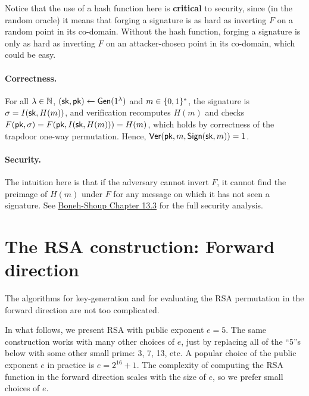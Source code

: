 Notice that the use of a hash function here is \textbf{critical} to
security, since (in the random oracle) it means that forging a signature
is as hard as inverting $F$ on a random point in its co-domain.
Without the hash function, forging a signature is only as hard as 
inverting $F$ on an attacker-chosen point in its co-domain, which 
could be easy.

\paragraph{Correctness.}
For all $\lambda \in \mathbb{N}$, $({\mathsf{sk}}, \mathsf{pk}) \gets \mathsf{Gen}(1^\lambda)$ and
$m \in \{0,1\}^*$, the signature is $\sigma = I({\mathsf{sk}}, H(m))$, and
verification recomputes $H(m)$ and checks
$F(\mathsf{pk}, \sigma) = F(\mathsf{pk}, I({\mathsf{sk}}, H(m))) = H(m)$,
which holds by correctness of the trapdoor one-way permutation.
Hence, $\mathsf{Ver}(\mathsf{pk}, m, \mathsf{Sign}({\mathsf{sk}}, m)) = 1$.


\paragraph{Security.}
The intuition here is that if the adversary cannot invert $F$,
it cannot find the preimage of $H(m)$ under $F$ for any message
on which it has not seen a signature.
See \href{https://toc.cryptobook.us/book.pdf#page=550}{Boneh-Shoup Chapter 13.3}
for the full security analysis.

\section{The RSA construction: Forward direction}

The algorithms for 
key-generation and 
for evaluating the RSA permutation
in the forward direction are not too complicated.

In what follows, we present RSA with 
public exponent $e=5$.
The same construction works with many other choices of $e$,
just by replacing all of the ``5''s below with some other
small prime: 3, 7, 13, etc.
A popular choice of the public exponent $e$ in practice is $e=2^{16}+1$.
The complexity of computing the RSA function in the forward
direction scales with the size of $e$, so we prefer small
choices of $e$.


